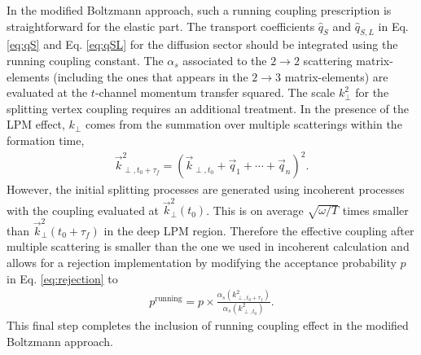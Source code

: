 \documentclass[aps, prc, reprint, amsmath, groupedaddress, nofootinbib]{revtex4-1}
\begin{document}
In the modified Boltzmann approach, such a running coupling prescription is straightforward for the elastic part.
The transport coefficients $\hat{q}_S$ and $\hat{q}_{S, L}$ in Eq. \ref{eq:qS} and Eq. \ref{eq:qSL} for the diffusion sector should be integrated using the running coupling constant.
The $\alpha_s$ associated to the $2\rightarrow 2$ scattering matrix-elements (including the ones that appears in the $2\rightarrow 3$ matrix-elements) are evaluated at the $t$-channel momentum transfer squared.
The scale $k_\perp^2$ for the splitting vertex coupling requires an additional treatment.
In the presence of the LPM effect, $k_\perp$ comes from the summation over multiple scatterings within the formation time,
\begin{eqnarray}\label{eq:kTn}
\vec{k}_{\perp, t_0+\tau_f}^2 = \left(\vec{k}_{\perp,t_0}+\vec{q}_1+\cdots+\vec{q}_n\right)^2.
\end{eqnarray} 
However, the initial splitting processes are generated using incoherent processes with the coupling evaluated at $\vec{k}_{\perp}^2(t_0)$.
This is on average $\sqrt{\omega/T}$ times smaller than $\vec{k}_{\perp}^2(t_0+\tau_f)$ in the deep LPM region.
Therefore the effective coupling after multiple scattering is smaller than the one we used in incoherent calculation and allows for a rejection implementation by modifying the acceptance probability $p$ in Eq. \ref{eq:rejection} to
\begin{eqnarray}
p^{\textrm{running}} = p\times \frac{\alpha_s(k_{\perp,t_0+\tau_f}^2)}{\alpha_s(k_{\perp,t_0}^2)}.
\end{eqnarray}
This final step completes the inclusion of running coupling effect in the modified Boltzmann approach.
\end{document}

